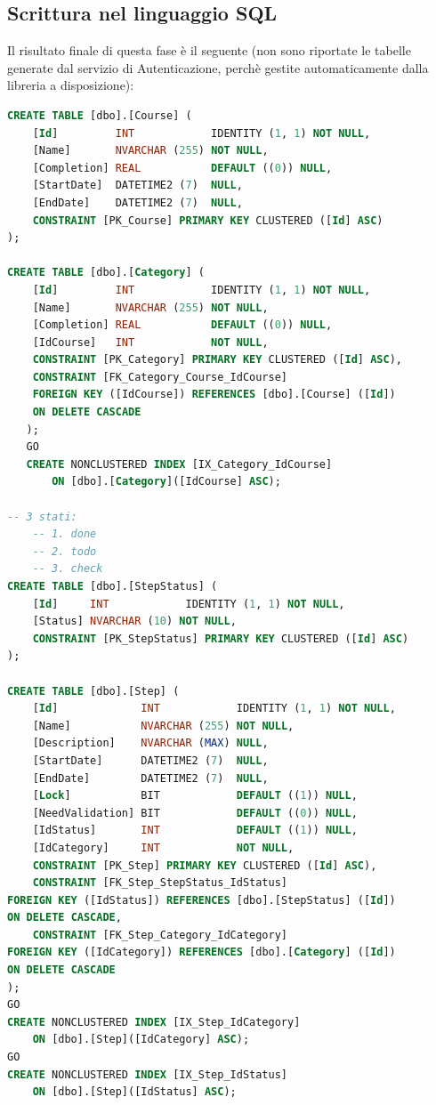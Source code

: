 \subsection{Scrittura nel linguaggio SQL}
Il risultato finale di questa fase è il seguente (non sono riportate le tabelle generate dal 
servizio di Autenticazione, perchè gestite automaticamente dalla libreria a disposizione):
\begin{lstlisting}[language=SQL, caption=traduzione della progettazione del database nel linguaggio SQL]
CREATE TABLE [dbo].[Course] ( 
    [Id]         INT            IDENTITY (1, 1) NOT NULL, 
    [Name]       NVARCHAR (255) NOT NULL, 
    [Completion] REAL           DEFAULT ((0)) NULL, 
    [StartDate]  DATETIME2 (7)  NULL, 
    [EndDate]    DATETIME2 (7)  NULL, 
    CONSTRAINT [PK_Course] PRIMARY KEY CLUSTERED ([Id] ASC) 
); 

CREATE TABLE [dbo].[Category] ( 
    [Id]         INT            IDENTITY (1, 1) NOT NULL, 
    [Name]       NVARCHAR (255) NOT NULL, 
    [Completion] REAL           DEFAULT ((0)) NULL, 
    [IdCourse]   INT            NOT NULL, 
    CONSTRAINT [PK_Category] PRIMARY KEY CLUSTERED ([Id] ASC), 
    CONSTRAINT [FK_Category_Course_IdCourse]
	FOREIGN KEY ([IdCourse]) REFERENCES [dbo].[Course] ([Id]) 
	ON DELETE CASCADE 
   ); 
   GO 
   CREATE NONCLUSTERED INDEX [IX_Category_IdCourse] 
	   ON [dbo].[Category]([IdCourse] ASC); 	

-- 3 stati: 
	-- 1. done 
	-- 2. todo 
	-- 3. check 
CREATE TABLE [dbo].[StepStatus] ( 
	[Id]     INT            IDENTITY (1, 1) NOT NULL, 
	[Status] NVARCHAR (10) NOT NULL, 
	CONSTRAINT [PK_StepStatus] PRIMARY KEY CLUSTERED ([Id] ASC) 
); 
	
CREATE TABLE [dbo].[Step] ( 
	[Id]             INT            IDENTITY (1, 1) NOT NULL, 
	[Name]           NVARCHAR (255) NOT NULL, 
	[Description]    NVARCHAR (MAX) NULL, 
	[StartDate]      DATETIME2 (7)  NULL, 
	[EndDate]        DATETIME2 (7)  NULL, 
	[Lock]           BIT            DEFAULT ((1)) NULL, 
	[NeedValidation] BIT            DEFAULT ((0)) NULL, 
	[IdStatus]       INT            DEFAULT ((1)) NULL, 
	[IdCategory]     INT            NOT NULL, 
	CONSTRAINT [PK_Step] PRIMARY KEY CLUSTERED ([Id] ASC), 
	CONSTRAINT [FK_Step_StepStatus_IdStatus]  
FOREIGN KEY ([IdStatus]) REFERENCES [dbo].[StepStatus] ([Id]) 
ON DELETE CASCADE, 
	CONSTRAINT [FK_Step_Category_IdCategory]  
FOREIGN KEY ([IdCategory]) REFERENCES [dbo].[Category] ([Id]) 
ON DELETE CASCADE 
); 
GO 
CREATE NONCLUSTERED INDEX [IX_Step_IdCategory] 
	ON [dbo].[Step]([IdCategory] ASC); 
GO 
CREATE NONCLUSTERED INDEX [IX_Step_IdStatus] 
	ON [dbo].[Step]([IdStatus] ASC); 


\end{lstlisting}
